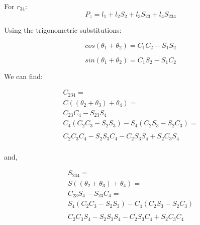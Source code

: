 \documentclass[transmag]{IEEEtran}
\begin{document}
For $r_{34}$:
\begin{equation}
P_z = l_1 + l_2 S_2 + l_3 S_{23} + l_4 S_{234} 
\label{2-3}
\end{equation}


Using the trigonometric substitutions:


\begin{equation}
cos (\theta_1 + \theta_2) = C_1 C_2 - S_1 S_2
\end{equation}

\begin{equation}
sin (\theta_1 + \theta_2) = C_1 S_2 - S_1 C_2
\end{equation}

We can find:


\begin{equation}
\begin{matrix}
C_{234} = \\
C((\theta_2 + \theta_3) + \theta_4) = \\
C_{23} C_4 - S_{23} S_4 = \\
C_4(C_2 C_3 - S_2 S_3) - S_4(C_2 S_3 - S_2 C_3) = \\
\\
C_2 C_3 C_4 - S_2 S_3 C_4 - C_2 S_3 S_4 + S_2 C_3 S_4 \\

\end{matrix}
\end{equation}

and,

\begin{equation}
\begin{matrix}
S_{234} = \\
S((\theta_2 + \theta_3) + \theta_4) = \\
C_{23} S_4 - S_{23} C_4 = \\
S_4 (C_2 C_3 - S_2 S_3) - C_4 (C_2 S_3 - S_2 C_3)\\
\\
C_2 C_3 S_4 - S_2 S_3 S_4 - C_2 S_3 C_4 + S_2 C_3 C_4\\

\end{matrix}
\end{equation}
\end{document}
